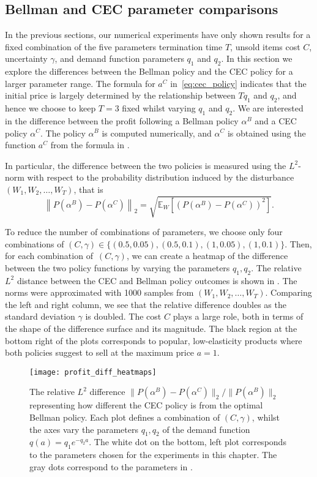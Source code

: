\documentclass[main.tex]{subfiles}
\begin{document}
\subsection{Bellman and CEC parameter comparisons}\label{sec:parameter_comparison}
In the previous sections, our numerical experiments have only shown
results for a fixed combination of the five parameters
termination time $T$, unsold items cost $C$, uncertainty $\gamma$, and
demand function parameters $q_1$ and $q_2$.
In this section we explore the differences between the Bellman policy
and the CEC policy for a larger parameter range.
The formula for $a^C$ in~\eqref{eq:cec_policy} indicates that the
initial price is largely determined by the relationship between
$Tq_1$ and $q_2$, and hence we choose to keep $T=3$ fixed whilst
varying $q_1$ and $q_2$.
We are interested in the difference between the profit following
a Bellman policy $\alpha^B$ and a CEC policy $\alpha^C$.
The policy $\alpha^B$ is computed numerically, and
$\alpha^C$ is obtained using the function $a^C$ from
the formula in .

In particular, the difference between the two policies is measured
using the $L^2$-norm with respect to the probability distribution
induced by the disturbance $(W_1,W_2,\dots,W_T)$, that is
\begin{equation}
  \left\|P(\alpha^B)-P(\alpha^C)\right\|_2
  =\sqrt{\mathbb E_W\left[{( P(\alpha^B)-P(\alpha^C) )}^2 \right]}.
\end{equation}

To reduce the number of combinations of parameters, we choose only
four combinations of
$(C,\gamma)\in\{(0.5,0.05),(0.5,0.1),(1,0.05),(1,0.1)\}$.
Then,
for each combination of\, $(C,\gamma)$,
we can create a heatmap of the difference between the two policy
functions by varying the parameters $q_1,q_2$.
The relative $L^2$ distance between the CEC and Bellman policy outcomes
is shown in . The norms were approximated
with \num{1000} samples from $(W_1,W_2,\dots,W_T)$.
Comparing the left and right column, we see that the relative difference doubles as
the standard deviation $\gamma$ is doubled. The cost $C$ plays a large
role, both in terms of the shape of the difference surface and its
magnitude.
The black region at the bottom right of the plots corresponds to popular,
low-elasticity products where both policies suggest to sell at the
maximum price $a=1$.
\begin{figure}[htbp]
  \texttt{[image: profit\_diff\_heatmaps]}
  \caption{The relative $L^2$ difference
    $\|P(\alpha^B)-P(\alpha^C)\|_2/\|P(\alpha^B)\|_2$ representing
    how different the CEC policy is from the optimal Bellman policy.
    Each plot defines a combination of $(C,\gamma)$, whilst
    the axes vary the parameters $q_1,q_2$ of the demand function
    $q(a)=q_1e^{-q_2a}$.
    The white dot on the bottom, left plot corresponds to the
    parameters chosen for the experiments in this chapter. The gray
    dots correspond to the parameters in .
  }\label{fig:profit_diff_heatmaps}
\end{figure}
\end{document}
